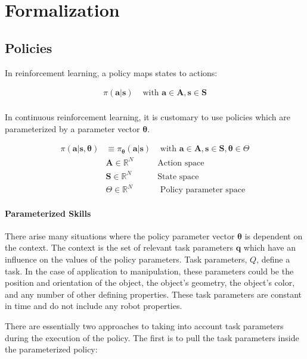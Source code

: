 \documentclass[12pt]{article}
\newcommand{\mymath}[1]{\ensuremath{#1}\xspace}
\newcommand{\act}    {\mymath{\mathbf{a}}}
\newcommand{\actsp}  {\mymath{\mathbf{A}}}
\newcommand{\sta}    {\mymath{\mathbf{s}}}
\newcommand{\stasp}  {\mymath{\mathbf{S}}}
\newcommand{\app}    {\mymath{\bm{\theta}}}
\newcommand{\appsp}  {\mymath{\Theta}}
\newcommand{\taskp}  {\mymath{\mathbf{q}}}
\newcommand{\taskpsp}{\mymath{Q}}
\begin{document}
\section{Formalization}

\subsection{Policies}

In reinforcement learning, a policy maps states to actions:

\begin{align}
\label{eq:policy}\pi(\act|\sta) & \mbox{~with~} \act \in \actsp, \sta \in \stasp\\
\end{align}

In continuous reinforcement learning, it is customary to use policies which are parameterized by a parameter vector \app.

\begin{align}
\label{eq:policy_par}\pi(\act|\sta,\app) & \equiv  \pi_{\app}(\act|\sta) & \mbox{~with~}  \act \in \actsp, \sta \in \stasp, \app \in \appsp \\
& \actsp \in \mathbb{R}^N & \mbox{Action space}\\
& \stasp \in \mathbb{R}^N & \mbox{State space}\\
& \appsp  \in \mathbb{R}^N & \mbox{~Policy parameter space}
\end{align}

\paragraph{Parameterized Skills}

There arise many situations where the  policy parameter vector $\app$ is dependent on the context. The context is the set of relevant task parameters $\taskp$ which have an influence on the values of the policy parameters. Task parameters, \emph{\taskpsp}, define a task. In the case of application to manipulation, these parameters could be the position and orientation of the object, the object's geometry, the object's color, and any number of other defining properties. These task parameters are constant in time and do not include any robot properties. 

There are essentially two approaches to taking into account task parameters during the execution of the policy. The first is to pull the task parameters inside the parameterized policy:
\end{document}
